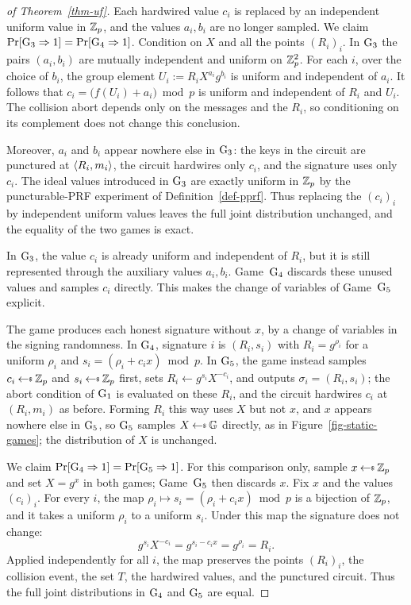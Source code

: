 \begin{proof}[of Theorem~\ref{thm-uf}]
 Each hardwired value $c_i$ is replaced by an independent uniform value in $\mathbb Z_p$, and the values $a_i, b_i$ are no longer sampled. We claim $\Pr[\textnormal{G}_3 \Rightarrow 1] = \Pr[\textnormal{G}_4 \Rightarrow 1]$. Condition on $X$ and all the points $(R_i)_i$. In $\textnormal{G}_3$ the pairs $(a_i,b_i)$ are mutually independent and uniform on $\mathbb Z_p^2$. For each $i$, over the choice of $b_i$, the group element $U_i := R_i X^{a_i}g^{b_i}$ is uniform and independent of $a_i$. It follows that $c_i=\big(f(U_i)+a_i\big)\bmod p$ is uniform and independent of $R_i$ and $U_i$. The collision abort depends only on the messages and the $R_i$, so conditioning on its complement does not change this conclusion.

Moreover, $a_i$ and $b_i$ appear nowhere else in $\textnormal{G}_3$: the keys in the circuit are punctured at $\langle R_i,m_i \rangle$, the circuit hardwires only $c_i$, and the signature uses only $c_i$. The ideal values introduced in $\textnormal{G}_3$ are exactly uniform in $\mathbb Z_p$ by the puncturable-PRF experiment of Definition~\ref{def-pprf}. Thus replacing the $(c_i)_i$ by independent uniform values leaves the full joint distribution unchanged, and the equality of the two games is exact.

In $\textnormal{G}_3$, the value $c_i$ is already uniform and independent of $R_i$, but it is still represented through the auxiliary values $a_i,b_i$. Game~$\textnormal{G}_4$ discards these unused values and samples $c_i$ directly. This makes the change of variables of Game~$\textnormal{G}_5$ explicit.

 The game produces each honest signature without $x$, by a change of variables in the signing randomness. In $\textnormal{G}_4$, signature $i$ is $(R_i, s_i)$ with $R_i = g^{\rho_i}$ for a uniform $\rho_i$ and $s_i = (\rho_i + c_i x) \bmod p$. In $\textnormal{G}_5$, the game instead samples $c_i \getsr \Zp$ and $s_i \getsr \Zp$ first, sets $R_i \gets g^{s_i} X^{-c_i}$, and outputs $\sigma_i = (R_i, s_i)$; the abort condition of $\textnormal{G}_1$ is evaluated on these $R_i$, and the circuit hardwires $c_i$ at $(R_i, m_i)$ as before. Forming $R_i$ this way uses $X$ but not $x$, and $x$ appears nowhere else in $\textnormal{G}_5$, so $\textnormal{G}_5$ samples $X \getsr \GG$ directly, as in Figure~\ref{fig-static-games}; the distribution of $X$ is unchanged.

We claim $\Pr[\textnormal{G}_4 \Rightarrow 1] = \Pr[\textnormal{G}_5 \Rightarrow 1]$. For this comparison only, sample $x\getsr\Zp$ and set $X=g^x$ in both games; Game~$\textnormal{G}_5$ then discards $x$. Fix $x$ and the values $(c_i)_i$. For every $i$, the map $\rho_i \mapsto s_i=(\rho_i+c_ix)\bmod p$ is a bijection of $\mathbb Z_p$, and it takes a uniform $\rho_i$ to a uniform $s_i$. Under this map the signature does not change:
$$
g^{s_i}X^{-c_i}=g^{s_i-c_ix}=g^{\rho_i}=R_i.
$$
Applied independently for all $i$, the map preserves the points $(R_i)_i$, the collision event, the set $T$, the hardwired values, and the punctured circuit. Thus the full joint distributions in $\textnormal{G}_4$ and $\textnormal{G}_5$ are equal.


\end{proof}
